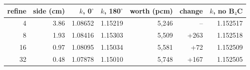 \begin{tabular}{rrrrrrr}
\hline
refine & side (cm) & $k$, 0$^\circ$ & $k$, 180$^\circ$ & worth (pcm) & change & $k$, no B$_4$C\\
\hline
4 & 3.86 & 1.08652 & 1.15219 & 5,246 & -- & 1.152517\\
8 & 1.93 & 1.08416 & 1.15303 & 5,509 & +263 & 1.152518\\
16 & 0.97 & 1.08095 & 1.15034 & 5,581 & +72 & 1.152509\\
32 & 0.48 & 1.07878 & 1.15010 & 5,748 & +167 & 1.152505\\
\hline
\end{tabular}

